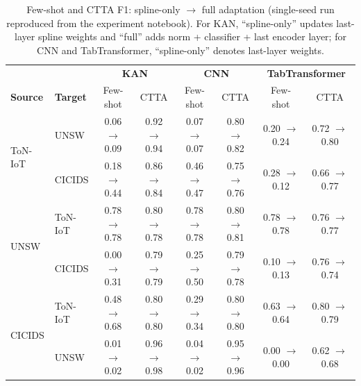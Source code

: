\begin{table}[t]
\centering
\caption{Few-shot and CTTA F1: spline-only $\rightarrow$ full adaptation (single-seed run reproduced from the experiment notebook). For KAN, ``spline-only'' updates last-layer spline weights and ``full'' adds norm + classifier + last encoder layer; for CNN and TabTransformer, ``spline-only'' denotes last-layer weights.}
\label{tab:fewshot_ctta_comparison}
\setlength{\tabcolsep}{4pt}
\begin{tabular}{l|l|cc|cc|cc}
\toprule
 & & \multicolumn{2}{c|}{\textbf{KAN}} & \multicolumn{2}{c|}{\textbf{CNN}} & \multicolumn{2}{c}{\textbf{TabTransformer}} \\
\textbf{Source} & \textbf{Target} & Few-shot & CTTA & Few-shot & CTTA & Few-shot & CTTA \\
\midrule
\multirow{2}{*}{ToN-IoT}
    & UNSW    & 0.06 $\rightarrow$ 0.09 & 0.92 $\rightarrow$ 0.94 & 0.07 $\rightarrow$ 0.07 & 0.80 $\rightarrow$ 0.82 & 0.20 $\rightarrow$ 0.24 & 0.72 $\rightarrow$ 0.80 \\
    & CICIDS  & 0.18 $\rightarrow$ 0.44 & 0.86 $\rightarrow$ 0.84 & 0.46 $\rightarrow$ 0.47 & 0.75 $\rightarrow$ 0.76 & 0.28 $\rightarrow$ 0.12 & 0.66 $\rightarrow$ 0.77 \\
\midrule
\multirow{2}{*}{UNSW}
    & ToN-IoT & 0.78 $\rightarrow$ 0.78 & 0.80 $\rightarrow$ 0.78 & 0.78 $\rightarrow$ 0.78 & 0.80 $\rightarrow$ 0.81 & 0.78 $\rightarrow$ 0.78 & 0.76 $\rightarrow$ 0.77 \\
    & CICIDS  & 0.00 $\rightarrow$ 0.31 & 0.79 $\rightarrow$ 0.79 & 0.25 $\rightarrow$ 0.50 & 0.79 $\rightarrow$ 0.78 & 0.10 $\rightarrow$ 0.13 & 0.76 $\rightarrow$ 0.74 \\
\midrule
\multirow{2}{*}{CICIDS}
    & ToN-IoT & 0.48 $\rightarrow$ 0.68 & 0.80 $\rightarrow$ 0.80 & 0.29 $\rightarrow$ 0.34 & 0.80 $\rightarrow$ 0.80 & 0.63 $\rightarrow$ 0.64 & 0.80 $\rightarrow$ 0.79 \\
    & UNSW    & 0.01 $\rightarrow$ 0.02 & 0.96 $\rightarrow$ 0.98 & 0.04 $\rightarrow$ 0.02 & 0.95 $\rightarrow$ 0.96 & 0.00 $\rightarrow$ 0.00 & 0.62 $\rightarrow$ 0.68 \\
\bottomrule
\end{tabular}
\end{table}
